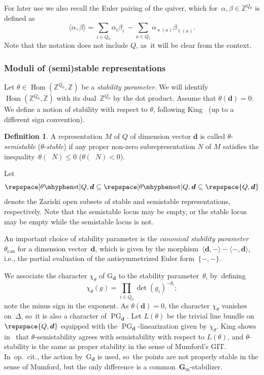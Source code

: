 \documentclass[JEP,XML,SOM,Unicode,NoEqCountersInSection,published]{cedram}
\theoremstyle{plain}
\theoremstyle{definition}
\newtheorem{definition}[theorem]{Definition}
\DeclareMathOperator\dimvect{\underline{\operatorname{dim}}}
\DeclareMathOperator\Hom{Hom}
\DeclareMathOperator\PG{PG}
\DeclareMathOperator\source{s}
\DeclareMathOperator\target{t}
\newcommand\can{\ensuremath{\mathrm{can}}}
\newcommand\dash{\nobreakdash-\hspace{0pt}}
\newcommand\Gm{\ensuremath{\mathbf{G}_{\mathrm{m}}}}
\newcommand\group[1][\tuple{d}]{\mathrm{G}_{#1}}
\newcommand\semistable{\ensuremath{\mhyphen\mathrm{sst}}}
\newcommand\stable{\ensuremath{\mhyphen\mathrm{st}}}
\newcommand\tuple[1]{\ensuremath{{\boldsymbol{#1}}}}
\begin{document}
For later use we also recall the Euler pairing of the quiver,
which for~$\alpha, \beta \in \mathbb{Z}^{Q_0}$
is defined as
\begin{equation*}
\langle \alpha, \beta \rangle = \sum_{i \in Q_0} \alpha_i \beta_i ~- \sum_{a \in Q_1} \alpha_{\source(a)} \beta_{\target(a)}.
\end{equation*}
Note that the notation does not include $Q$, as~it will be clear from the context.

\subsubsection*{Moduli of (semi)stable representations}
Let $\theta\in\Hom(\mathbb{Z}^{Q_0},\mathbb{Z})$ be a \emph{stability parameter}.
We will identify $\Hom(\mathbb{Z}^{Q_0},\mathbb{Z})$ with its dual~$\mathbb{Z}^{Q_0}$ by the dot product.
Assume that $\theta(\tuple{d}) = 0$.
We define a notion of stability with respect to $\theta$,
following King~\cite{MR1315461} (up to a different sign convention).
\begin{definition}
\label{definition:semistability}
A representation $M$ of $Q$ of dimension vector $\tuple{d}$
is called $\theta$\nobreakdash-\emph{semistable} (\resp $\theta$\dash\emph{stable})
if any proper non-zero subrepresentation $N$ of $M$
satisfies the inequality~$\theta(\dimvect N) \leq 0$ (\resp $\theta(\dimvect N) < 0$).
\end{definition}

Let
\begin{equation*}
\repspace[\theta\stable]{Q,\tuple{d}}
\subseteq\repspace[\theta\semistable]{Q,\tuple{d}}
\subseteq\repspace{Q,\tuple{d}}
\end{equation*}
denote the Zariski open subsets of stable and semistable representations, respectively.
Note that the semistable locus may be empty,
or the stable locus may be empty while the semistable locus is not.

An important choice of stability parameter is
the \emph{canonical stability parameter}~$\theta_\can$ for a dimension vector~$\tuple{d}$,
which is given by the morphism~$\langle\tuple{d},-\rangle-\langle-,\tuple{d}\rangle$,
i.e.,
the partial evaluation of the antisymmetrized Euler form~$\{-,-\}$.

We associate the character $\chi_\theta$ of $\group$
to the stability parameter~$\theta$, by~defining
\begin{equation*}
\chi_\theta(g) = \prod_{i \in Q_0} \det(g_i)^{-\theta_i};
\end{equation*}
note the minus sign in the exponent.
As $\theta(\tuple{d}) = 0$,
the character $\chi_{\theta}$ vanishes on~$\Delta$, so~it is also a character of $\PG_{\tuple{d}}$.
Let $L(\theta)$ be the trivial line bundle on $\repspace{Q,\tuple{d}}$
equipped with the $\PG_\tuple{d}$-linearization given by $\chi_\theta$.
King shows in~\cite[Th.\,4.1]{MR1315461} that $\theta$-semistability
agrees with semistability with respect to $L(\theta)$,
and $\theta$-stability is the same as proper stability in the sense of Mumford's GIT. In~op.~cit., the action by~$\group$ is used, so~the points are not properly stable in the sense of Mumford,
but the only difference is a common~$\Gm$-stabilizer.
\end{document}
